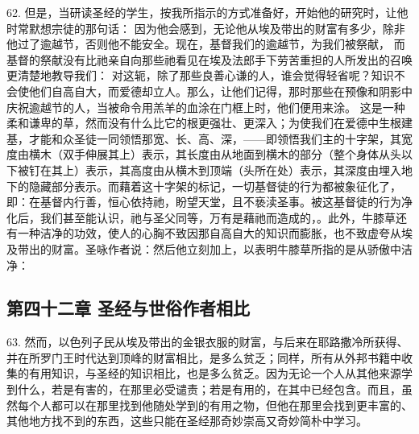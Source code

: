 62. 但是，当研读圣经的学生，按我所指示的方式准备好，开始他的研究时，让他时常默想宗徒的那句话： 因为他会感到，无论他从埃及带出的财富有多少，除非他过了逾越节，否则他不能安全。现在，基督我们的逾越节，为我们被祭献， 而基督的祭献没有比祂亲自向那些祂看见在埃及法郎手下劳苦重担的人所发出的召唤更清楚地教导我们： 对这轭，除了那些良善心谦的人，谁会觉得轻省呢？知识不会使他们自高自大，而爱德却立人。那么，让他们记得，那时那些在预像和阴影中庆祝逾越节的人，当被命令用羔羊的血涂在门框上时，他们便用来涂。 这是一种柔和谦卑的草，然而没有什么比它的根更强壮、更深入；为使我们在爱德中生根建基，才能和众圣徒一同领悟那宽、长、高、深，——即领悟我们主的十字架，其宽度由横木（双手伸展其上）表示，其长度由从地面到横木的部分（整个身体从头以下被钉在其上）表示，其高度由从横木到顶端（头所在处）表示，其深度由埋入地下的隐藏部分表示。而藉着这十字架的标记，一切基督徒的行为都被象征化了，即：在基督内行善，恒心依持祂，盼望天堂，且不亵渎圣事。被这基督徒的行为净化后，我们甚至能认识，祂与圣父同等，万有是藉祂而造成的，。此外，牛膝草还有一种洁净的功效，使人的心胸不致因那自高自大的知识而膨胀，也不致虚夸从埃及带出的财富。圣咏作者说：然后他立刻加上，以表明牛膝草所指的是从骄傲中洁净：\par


\subsection{第四十二章 圣经与世俗作者相比}

63. 然而，以色列子民从埃及带出的金银衣服的财富，与后来在耶路撒冷所获得、并在所罗门王时代达到顶峰的财富相比，是多么贫乏；同样，所有从外邦书籍中收集的有用知识，与圣经的知识相比，也是多么贫乏。因为无论一个人从其他来源学到什么，若是有害的，在那里必受谴责；若是有用的，在其中已经包含。而且，虽然每个人都可以在那里找到他随处学到的有用之物，但他在那里会找到更丰富的、其他地方找不到的东西，这些只能在圣经那奇妙崇高又奇妙简朴中学习。\par

